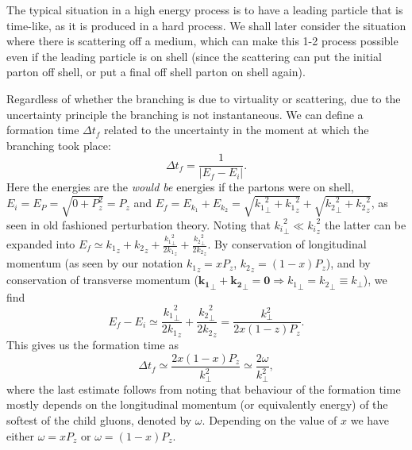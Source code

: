 \documentclass[a4paper,12pt]{article}
\numberwithin{equation}{section}
\begin{document}
The typical situation in a high energy process is to have a leading particle that is time-like, as it is produced in a hard process. We shall later consider the situation where there is scattering off a medium, which can make this 1-2 process possible even if the leading particle is on shell (since the scattering can put the initial parton off shell, or put a final off shell parton on shell again).

Regardless of whether the branching is due to virtuality or scattering, due to the uncertainty principle the branching is not instantaneous. We can define a formation time $\Delta t_f$ related to the uncertainty in the moment at which the branching took place:
\begin{equation}
\Delta t_f=\frac{1}{|E_f-E_i|}.
\end{equation}
Here the energies are the \emph{would be} energies if the partons were on shell, $E_i=E_P=\sqrt{0+P_z^2}=P_z$ and $E_f=E_{k_1}+E_{k_2}=\sqrt{{k_1}_\perp^2 + {k_1}_z^2}+\sqrt{{k_2}_\perp^2 + {k_2}_z^2}$, as seen in old fashioned perturbation theory. Noting that ${k_i}_\perp^2\ll {k_i}_z^2$ the latter can be expanded into $E_f \simeq {k_1}_z+{k_2}_z + \frac{{k_1}_\perp^2}{2{k_1}_z}+\frac{{k_2}_\perp^2}{2{k_2}_z}$. By conservation of longitudinal momentum (as seen by our notation ${k_1}_z=xP_z$, ${k_2}_z=(1-x)P_z$), and by conservation of transverse momentum ($\mathbf{k_1}_\perp+\mathbf{k_2}_\perp=\mathbf{0}\Rightarrow {k_1}_\perp={k_2}_\perp \equiv k_\perp$), we find
\begin{equation}
E_f-E_i \simeq \frac{{k_1}_\perp^2}{2{k_1}_z}+\frac{{k_2}_\perp^2}{2{k_2}_z} = \frac{k_\perp^2}{2x(1-z)P_z}.
\end{equation}
This gives us the formation time as
\begin{equation}\label{formation}
\Delta t_f \simeq \frac{2x(1-x)P_z}{k_\perp^2}\simeq \frac{2 \omega}{k_\perp^2},
\end{equation}
where the last estimate follows from noting that behaviour of the formation time mostly depends on the longitudinal momentum (or equivalently energy) of the softest of the child gluons, denoted by $\omega$. Depending on the value of $x$ we have either $\omega=xP_z$ or $\omega=(1-x)P_z$.%
\end{document}
